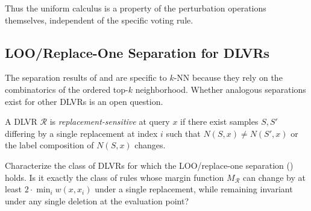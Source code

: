 Thus the uniform calculus is a property of the perturbation operations
themselves, independent of the specific voting rule.

\subsection{LOO/Replace-One Separation for DLVRs}

The separation results of  and
 are specific to $k$-NN because they rely on the
combinatorics of the ordered top-$k$ neighborhood. Whether analogous
separations exist for other DLVRs is an open question.

\begin{definition}
A DLVR $\mathcal{R}$ is {\em replacement-sensitive} at query $x$ if there
exist samples $S, S'$ differing by a single replacement at index $i$ such
that $N(S,x) \neq N(S',x)$ or the label composition of $N(S,x)$ changes.
\end{definition}

\begin{openproblem}
Characterize the class of DLVRs for which the LOO/replace-one separation
() holds. Is it exactly the class of rules whose
margin function $M_{\mathcal{R}}$ can change by at least $2 \cdot
\min_i w(x,x_i)$ under a single replacement, while remaining invariant under
any single deletion at the evaluation point?
\end{openproblem}
